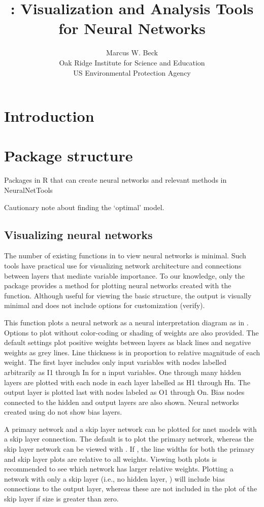 \documentclass[article]{jss}\usepackage[]{graphicx}\usepackage[]{color}
\author{Marcus W. Beck\\Oak Ridge Institute for Science and Education\\US Environmental Protection Agency}
\title{\pkg{NeuralNetTools}: Visualization and Analysis Tools for Neural Networks}
\begin{document}

\section[Introduction]{Introduction}

\citep{Goh95}

\section[Package structure]{Package structure}

Packages in R that can create neural networks and relevant methods in NeuralNetTools

Cautionary note about finding the `optimal' model.

\subsection{Visualizing neural networks}

The number of existing functions in  to view neural networks is minimal.  Such tools have practical use for visualizing network architecture and connections between layers that mediate variable importance. To our knowledge, only the  package provides a method for plotting neural networks created with the  function.  Although useful for viewing the basic structure, the output is visually minimal and does not include options for customization (verify).

This function plots a neural network as a neural interpretation diagram as in \citet{Ozesmi99}. Options to plot without color-coding or shading of weights are also provided. The default settings plot positive weights between layers as black lines and negative weights as grey lines. Line thickness is in proportion to relative magnitude of each weight. The first layer includes only input variables with nodes labelled arbitrarily as I1 through In for n input variables. One through many hidden layers are plotted with each node in each layer labelled as H1 through Hn. The output layer is plotted last with nodes labeled as O1 through On. Bias nodes connected to the hidden and output layers are also shown. Neural networks created using  do not show bias layers.

A primary network and a skip layer network can be plotted for nnet models with a skip layer connection. The default is to plot the primary network, whereas the skip layer network can be viewed with . If , the line widths for both the primary and skip layer plots are relative to all weights. Viewing both plots is recommended to see which network has larger relative weights. Plotting a network with only a skip layer (i.e., no hidden layer, ) will include bias connections to the output layer, whereas these are not included in the plot of the skip layer if size is greater than zero.
\end{document}
